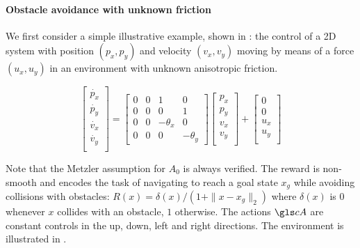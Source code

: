 \paragraph{Obstacle avoidance with unknown friction}
We first consider a simple illustrative example, shown in : the control of a 2D system with position $(p_x,p_y)$ and velocity $(v_x, v_y)$ moving by means of a force $(u_x, u_y)$ in an environment with unknown anisotropic friction.

\begin{equation*}
\begin{bmatrix}
\dot{p_x}\\
\dot{p_y}\\
\dot{v_x}\\
\dot{v_y}\\
\end{bmatrix} = 
\begin{bmatrix}
0 & 0 & 1 & 0 \\
0 & 0 & 0 & 1 \\
0 & 0 & -\theta_x & 0 \\
0 & 0 & 0 & -\theta_y
\end{bmatrix}
\begin{bmatrix}
{p_x}\\
{p_y}\\
{v_x}\\
{v_y}\\
\end{bmatrix}
+
\begin{bmatrix}
0\\
0\\
{u_x}\\
{u_y}\\
\end{bmatrix}
\end{equation*}


Note that the Metzler assumption for $A_0$ is always verified. The reward is non-smooth and encodes the task of navigating to reach a goal state $x_g$ while avoiding collisions with obstacles: $R(x) = \delta(x)/(1 + \|x - x_g\|_2)$  where $\delta(x)$ is $0$ whenever $x$ collides with an obstacle, $1$ otherwise. The actions $\cA$ are constant controls in the up, down, left and right directions. The environment is illustrated in .

